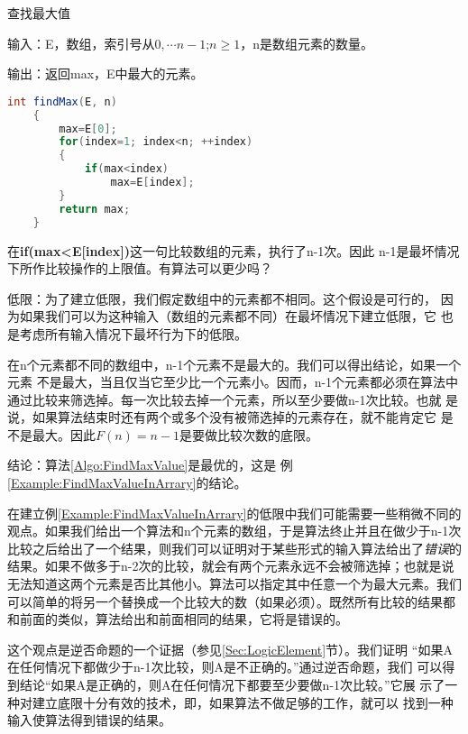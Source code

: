 \begin{algorithm}\label{Algo:FindMaxValue}
查找最大值

输入：E，数组，索引号从$0,\cdots n-1$;$n\geq 1$，n是数组元素的数量。

输出：返回max，E中最大的元素。

\begin{lstlisting}[language={Java}, keywordstyle=\color{blue!70}, commentstyle=\color{red!50!green!50!blue!50}]
    int findMax(E, n)
    {
        max=E[0];
        for(index=1; index<n; ++index)
        {
            if(max<index)
                max=E[index];
        }
        return max;
    }
\end{lstlisting}

在\textbf{if(max<E[index])}这一句比较数组的元素，执行了n-1次。因此
n-1是最坏情况下所作比较操作的上限值。有算法可以更少吗？

低限：为了建立低限，我们假定数组中的元素都不相同。这个假设是可行的，
因为如果我们可以为这种输入（数组的元素都不同）在最坏情况下建立低限，它
也是考虑所有输入情况下最坏行为下的低限。

在n个元素都不同的数组中，n-1个元素不是最大的。我们可以得出结论，如果一个元素
不是最大，当且仅当它至少比一个元素小。因而，n-1个元素都必须在算法中
通过比较来筛选掉。每一次比较去掉一个元素，所以至少要做n-1次比较。也就
是说，如果算法结束时还有两个或多个没有被筛选掉的元素存在，就不能肯定它
是不是最大。因此$F(n)=n-1$是要做比较次数的底限。

结论：算法\ref{Algo:FindMaxValue}是最优的，这是
例\ref{Example:FindMaxValueInArrary}的结论。
\end{algorithm}

在建立例\ref{Example:FindMaxValueInArrary}的低限中我们可能需要一些稍微不同的
观点。如果我们给出一个算法和n个元素的数组，于是算法终止并且在做少于n-1次
比较之后给出了一个结果，则我们可以证明对于某些形式的输入算法给出了\emph{错误}的
结果。如果不做多于n-2次的比较，就会有两个元素永远不会被筛选掉；也就是说
无法知道这两个元素是否比其他小。算法可以指定其中任意一个为最大元素。我们
可以简单的将另一个替换成一个比较大的数（如果必须）。既然所有比较的结果都
和前面的类似，算法给出和前面相同的结果，它将是错误的。

这个观点是逆否命题的一个证据（参见\ref{Sec:LogicElement}节）。我们证明
“如果A在任何情况下都做少于n-1次比较，则A是不正确的。”通过逆否命题，我们
可以得到结论“如果A是正确的，则A在任何情况下都要至少要做n-1次比较。”它展
示了一种对建立底限十分有效的技术，即，如果算法不做足够的工作，就可以
找到一种输入使算法得到错误的结果。

